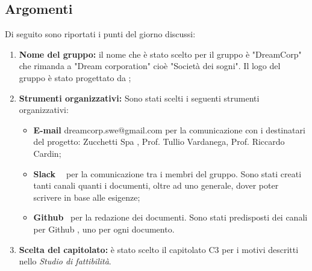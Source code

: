 \documentclass[12pt]{article}
\begin{document}
    \subsection{Argomenti}
        Di seguito sono riportati i punti del giorno discussi:
    \begin{enumerate}
        \item \textbf{Nome del gruppo:} il nome che è stato scelto per il gruppo è "DreamCorp" che rimanda a "Dream corporation" cioè "Società dei sogni". Il logo del gruppo è stato progettato da \daG;
        \item \textbf{Strumenti organizzativi:} Sono stati scelti i seguenti strumenti organizzativi: 
        \begin{itemize}
            \item \textbf{E-mail} dreamcorp.swe@gmail.com per la comunicazione con i destinatari del progetto: Zucchetti Spa \pedice , Prof. Tullio Vardanega, Prof. Riccardo Cardin; 
            \item \textbf{Slack \pedice~} per la comunicazione tra i membri del gruppo. Sono stati creati tanti canali quanti i documenti, oltre ad uno generale, dover poter scrivere in base alle esigenze;
            \item \textbf{Github} \pedice~per la redazione dei documenti. Sono stati predisposti dei canali per Github \pedice, uno per ogni documento.
        \end{itemize}
        \item \textbf{Scelta del capitolato:} è stato scelto il capitolato C3 per i motivi descritti nello \textit{Studio di fattibilità}. 
    \end{enumerate}
\end{document}
